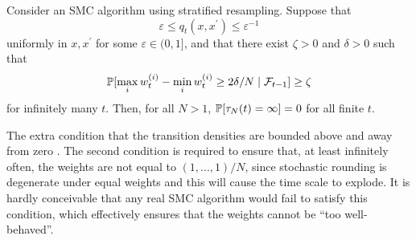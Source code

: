 \begin{prop}\label{thm:strat_nontriviality}
Consider an SMC algorithm using stratified resampling.
Suppose that 
\begin{equation*}
\varepsilon \leq q_t(x, x^\prime) \leq \varepsilon^{-1}
\end{equation*}
uniformly in $x,x^\prime$ for some $\varepsilon \in (0,1]$, and that there exist $\zeta >0$ and $\delta >0$ such that 
\begin{equation*}
\mathbb{P}[ \max_i w_t^{(i)} - \min_i w_t^{(i)} \geq 2\delta/N \mid \mathcal{F}_{t-1} ] \geq \zeta
\end{equation*}
 for infinitely many $t$. Then, for all $N>1$, $\mathbb{P}[ \tau_N(t) = \infty ] =0$ for all finite $t$.
\end{prop}


The extra condition that the transition densities are bounded above and away from zero .
The second condition is required to ensure that, at least infinitely often, the weights are not equal to $(1,\dots,1)/N$, since stochastic rounding is degenerate under equal weights and this will cause the time scale to explode. 
It is hardly conceivable that any real SMC algorithm would fail to satisfy this condition, which effectively ensures that the weights cannot be ``too well-behaved''.


